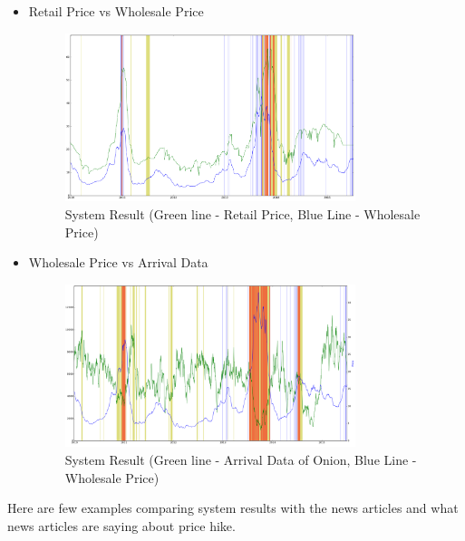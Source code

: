 \begin{itemize}
	
 \item Retail Price vs Wholesale Price
			
			\begin{figure}[H]
		    	\centering
  		    	\includegraphics[width=0.8\textwidth]{graphs/MumbaiRvsW.png}
		    	\caption{System Result (Green line - Retail Price, Blue Line - Wholesale Price)}
		    	\label{fig:RvsW}
			\end{figure}
			
	
 \item Wholesale Price vs Arrival Data
			
			\begin{figure}[H]
		    	\centering
  		    	\includegraphics[width=0.8\textwidth]{graphs/mumbaiWvsA.png}
		    	\caption{System Result (Green line - Arrival Data of Onion, Blue Line - Wholesale Price)}
		    	\label{fig:WvsA}
			\end{figure}
			
	
\end{itemize}


Here are few examples comparing system results with the news articles and what news articles are saying about price hike.


